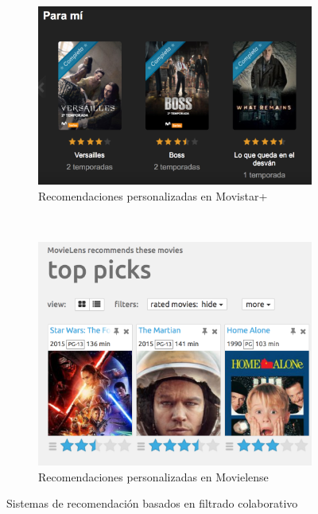 \documentclass[withindex, glossary]{cam-thesis}
\begin{document}
\begin{figure}[!htbp]
    \centering
    \begin{subfigure}[t]{0.4\textwidth}
        \includegraphics[width=\textwidth]{./figures/rec-movistar.png}
        \caption{Recomendaciones personalizadas en Movistar+}\label{rec-movistar}
    \end{subfigure}
    ~
    \begin{subfigure}[t]{0.4\textwidth}
        \centering
        \includegraphics[width=\textwidth]{./figures/rec-movielense.png}
        \caption{Recomendaciones personalizadas en Movielense}\label{rec-movielense}
    \end{subfigure}
    \caption{Sistemas de recomendación basados en filtrado colaborativo}
\end{figure}
\end{document}
